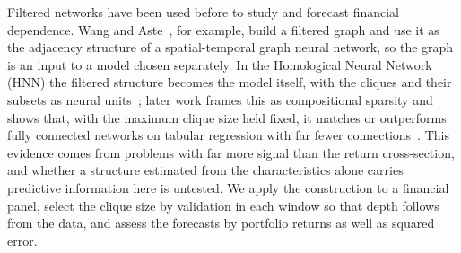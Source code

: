 \documentclass[sigconf,nonacm]{acmart}
\begin{document}
Filtered networks have been used before to study and forecast financial
dependence. Wang and Aste~\cite{wang2022icaif}, for example, build a filtered
graph and use it as the adjacency structure of a spatial-temporal graph neural
network, so the graph is an input to a model chosen separately. In the
Homological Neural Network (HNN) the filtered structure becomes the model
itself, with the cliques and their subsets as neural units~\cite{wang2023hnn}; later
work frames this as compositional sparsity and shows that, with the maximum
clique size held fixed, it matches or outperforms fully connected networks on
tabular regression with far fewer connections~\cite{lin2026}. This evidence comes
from problems with far more signal than the return cross-section, and whether a
structure estimated from the characteristics alone carries predictive
information here is untested. We apply the construction to a financial panel,
select the clique size by validation in each window so that depth follows from
the data, and assess the forecasts by portfolio returns as well as squared error.






\end{document}
